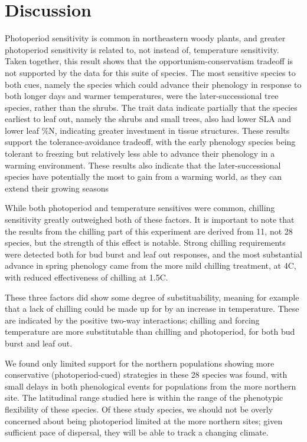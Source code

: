 \documentclass[11pt]{article}
\begin{document}
\section*{Discussion}

Photoperiod sensitivity is common in northeastern woody plants, and greater photoperiod sensitivity is related to, not instead of, temperature sensitivity. Taken together, this result shows that the opportunism-conservatism tradeoff is not supported by the data for this suite of species. The most sensitive species to both cues, namely the species which could advance their phenology in response to both longer days and warmer temperatures, were the later-successional tree species, rather than the shrubs. The trait data indicate partially that the species earliest to leaf out, namely the shrubs and small trees, also had lower SLA and lower leaf \%N, indicating greater investment in tissue structures. These results support the tolerance-avoidance tradeoff, with the early phenology species being tolerant to freezing but relatively less able to advance their phenology in a warming environment. These results also indicate that the later-successional species have potentially the most to gain from a warming world, as they can extend their growing seasons  

While both photoperiod and temperature sensitives were common, chilling sensitivity greatly outweighed both of these factors. It is important to note that the results from the chilling part of this experiment are derived from 11, not 28 species, but the strength of this effect is notable. Strong chilling requirements were detected both for bud burst and leaf out responses, and the most substantial advance in spring phenology came from the more mild chilling treatment, at 4\degree C, with reduced effectiveness of chilling at 1.5\degree C. 

These three factors did show some degree of substituability, meaning for example that a lack of chilling could be made up for by an increase in temperature. These are indicated by the positive two-way interactions; chilling and forcing temperature are more substitutable than chilling and photoperiod, for both bud burst and leaf out.

We found only limited support for the northern populations showing more conservative (photoperiod-cued) strategies in these 28 species was found, with small delays in both phenological events for populations from the more northern site. The latitudinal range studied here is within the range of the phenotypic flexibility of these species. Of these study species, we should not be overly concerned about being photoperiod limited at the more northern sites; given sufficient pace of dispersal, they will be able to track a changing climate.
\end{document}
